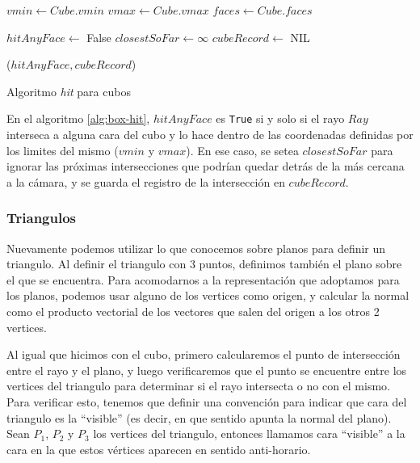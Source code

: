 \begin{algorithm}
\begin{algorithmic}[1]
    \State $vmin \gets Cube.vmin$ 
    \State $vmax \gets Cube.vmax$
    \State $faces \gets Cube.faces$

    \State $hitAnyFace \gets$ False
    \State $closestSoFar \gets \infty$
    \State $cubeRecord \gets$ NIL

     

        \EndIf
    \EndFor

    \State \Return ($hitAnyFace, cubeRecord$)
\EndFunction
\end{algorithmic}
\caption{Algoritmo \textit{hit} para cubos}
\label{alg:box-hit}
\end{algorithm}

En el algoritmo \ref{alg:box-hit}, $hitAnyFace$ es \texttt{True} si y solo si el
rayo $Ray$ interseca a alguna cara del cubo y lo hace dentro de las coordenadas
definidas por los limites del mismo ($vmin$ y $vmax$). En ese caso, se setea
$closestSoFar$ para ignorar las próximas intersecciones que podrían quedar detrás
de la más cercana a la cámara, y se guarda el registro de la intersección en
$cubeRecord$.

\subsubsection{Triangulos}

Nuevamente podemos utilizar lo que conocemos sobre planos para definir un
triangulo. Al definir el triangulo con 3 puntos, definimos también el plano sobre
el que se encuentra. Para acomodarnos a la representación que adoptamos para los
planos, podemos usar alguno de los vertices como origen, y calcular la normal
como el producto vectorial de los vectores que salen del origen a los otros 2
vertices.


Al igual que hicimos con el cubo, primero calcularemos el punto de intersección
entre el rayo y el plano, y luego verificaremos que el punto se encuentre entre
los vertices del triangulo para determinar si el rayo intersecta o no con el
mismo. Para verificar esto, tenemos que definir una convención para indicar que
cara del triangulo es la ``visible'' (es decir, en que sentido apunta la normal
del plano). Sean $P_1$, $P_2$ y $P_3$ los vertices del triangulo, entonces llamamos
cara ``visible'' a la cara en la que estos vértices aparecen en sentido anti-horario.

